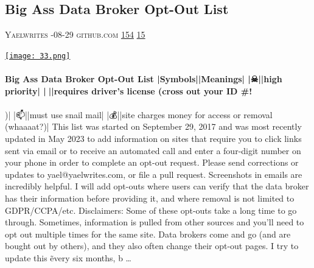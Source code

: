 \documentclass[10pt,a4paper]{article}
\begin{document}
\begin{multicols}{2}
\raggedcolumns
\noindent\begin{minipage}{\linewidth}
\medskip
\subsection{Big Ass Data Broker Opt-Out List}
\textsc{\footnotesize
{\scriptsize\faUser}\space 
Yaelwrites 
{\scriptsize\faCalendar}-08-29 
{\scriptsize\faGithub}\space 
github.com 
{\scriptsize\faThumbsOUp}\space 
\href{http://news.ycombinator.com/item?id=37265346\&utm\_term=comment}{154} 
{\scriptsize\faComments}\space 
\href{http://news.ycombinator.com/item?id=37265346\&utm\_term=comment}{15} 
}
\par\medskip\noindent
\href{https://github.com/yaelwrites/Big-Ass-Data-Broker-Opt-Out-List?utm\_source=hackernewsletter\&utm\_medium=email\&utm\_term=data}{
    \texttt{[image: 33.png]}
}
\end{minipage}
\paragraph{}
\textbf{Big Ass Data Broker Opt-Out List
|Symbols||Meanings|
|☠||high priority|
|🎫||requires driver’s license (cross out your ID \#!}
\paragraph{}
)|
|📫||must use snail mail|
|💰||site charges money for access or removal (whaaaat?)|
This list was started on September 29, 2017 and was most recently updated in May 2023 to add information on sites that require you to click links sent via email or to receive an automated call and enter a four-digit number on your phone in order to complete an opt-out request.
Please send corrections or updates to yael@yaelwrites.com, or file a pull request. Screenshots in emails are incredibly helpful. I will add opt-outs where users can verify that the data broker has their information before providing it, and where removal is not limited to GDPR/CCPA/etc.
Disclaimers: Some of these opt-outs take a long time to go through. Sometimes, information is pulled from other sources and you’ll need to opt out multiple times for the same site. Data brokers come and go (and are bought out by others), and they also often change their opt-out pages. I try to update this \~every six months, b
\dots\par
\noindent\begin{minipage}{\linewidth}
\medskip

\end{minipage}
\end{multicols}
\end{document}
